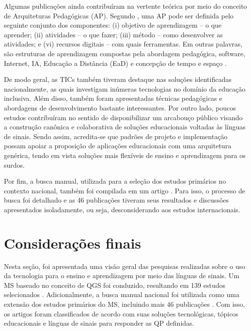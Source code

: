 Algumas publicações ainda contribuíram na vertente teórica por meio do conceito de Arquiteturas Pedagógicas (AP). Segundo , uma AP pode ser definida pelo seguinte conjunto dos componentes: (i) objetivo de aprendizagem -- o que aprender; (ii) atividades -- o que fazer; (iii) método -- como desenvolver as atividades; e (vi) recursos digitais -- com quais ferramentas. Em outras palavras, são estruturas de aprendizagem compostas pela abordagem pedagógica, software, Internet, IA, Educação a Distância (EaD) e concepção de tempo e espaço \cite{BRA27}.

De modo geral, as TICs também tiveram destaque nas soluções identificadas nacionalmente, as quais investigam inúmeras tecnologias no domínio da educação inclusiva. Além disso, também foram apresentadas técnicas pedagógicas e abordagens de desenvolvimento bastante interessantes. Por outro lado, poucos estudos contribuíram no sentido de disponibilizar um arcabouço público visando a construção canônica e colaborativa de soluções educacionais voltadas às línguas de sinais. Sendo assim, acredita-se que padrões de projeto e implementação possam apoiar a proposição de aplicações educacionais com uma arquitetura genérica, tendo em vista soluções mais flexíveis de ensino e aprendizagem para os surdos.


Por fim, a busca manual, utilizada para a seleção dos estudos primários no contexto nacional, também foi compilada em um artigo \cite{FalvoJr2020_SBIE}. Para isso, o processo de busca foi detalhado e as 46 publicações tiveram seus resultados e discussões apresentados isoladamente, ou seja, desconsiderando aos estudos internacionais. 

\section{Considerações finais}
\label{ms:fim}

Nesta seção, foi apresentada uma visão geral das pesquisas realizadas sobre o uso da tecnologia para o ensino e aprendizagem por meio das línguas de sinais. Um MS baseado no conceito de QGS foi conduzido, resultando em 139 estudos selecionados \cite{FalvoJr2020_FIE}. Adicionalmente, a busca manual nacional foi utilizada como uma extensão dos estudos primários do MS, incluindo mais 46 publicações \cite{FalvoJr2020_SBIE}. Com isso, os artigos foram classificados de acordo com suas soluções tecnológicas, tópicos educacionais e línguas de sinais para responder as QP definidas. 


